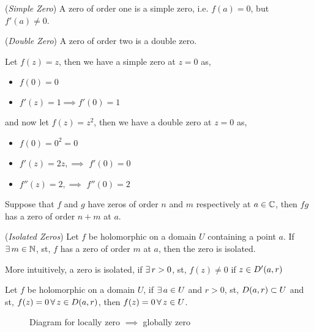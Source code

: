 \documentclass{article}
\begin{document}
\begin{defi}{(\textit{Simple Zero})}
  A zero of order one is a simple zero, i.e. $f(a) = 0$, but $f'(a) \ne 0$.
\end{defi}

\begin{defi}{(\textit{Double Zero})}
  A zero of order two is a double zero.
\end{defi}

\begin{eg}
  Let $f(z) = z$, then we have a simple zero at $z=0$ as,
  \begin{itemize}
    \item $f(0) = 0$
    \item $f'(z) = 1 \implies f'(0) = 1$
  \end{itemize}
  and now let $f(z) = z^2$, then we have a double zero at $z = 0$ as,
  \begin{itemize}
    \item $f(0) = 0^2 = 0$
    \item $f'(z) = 2z, \implies$ $f'(0) = 0$
    \item $f''(z) = 2, \implies$ $f''(0) = 2$
  \end{itemize}
\end{eg}

\begin{nlemma}
  Suppose that $f$ and $g$ have zeros of order $n$ and $m$ respectively at $a\in\mathbb{C}$, then $fg$ has a zero of order $n + m$ at $a$.
\end{nlemma}

\begin{nlemma}{(\textit{Isolated Zeros})}
  Let $f$ be holomorphic on a domain $U$ containing a point $a$. If $\exists\, m\in\mathbb{N}$, st, $f$ has a zero of order $m$ at $a$, then the zero is isolated.
\end{nlemma}

More intuitively, a zero is isolated, if $\exists\, r > 0$, st, $f(z)\ne 0$ if $z\in D'(a, r)$

\begin{nthm}
  Let $f$ be holomorphic on a domain $U$, if $\exists\, a\in U$ and $r > 0$, st, $D(a, r) \subset U$ and st, $f(z) = 0\, \forall\, z\in D(a, r)$, then $f(z) = 0\, \forall\, z \in U$.
\end{nthm}


\begin{figure}[!ht]
  \centering
  \caption{Diagram for locally zero $\implies$ globally zero}
\end{figure}
\end{document}
